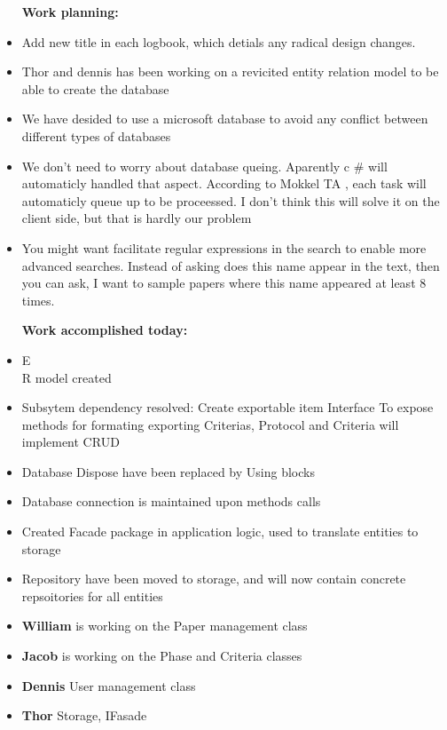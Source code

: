 \begin{itemize}
	\item [\textbf{Work planning:}]
	\item Add new title in each logbook, which detials any radical design changes.
	\item Thor and dennis has been working on a revicited entity relation model to be able to create the database
	\item We have desided to use a microsoft database to avoid any conflict between different types of databases
	\item We don't need to worry about database queing. Aparently c \# will automaticly handled that aspect. According to Mokkel TA , each task will automaticly queue up to be proceessed. I don't think this will solve it on the client side, but that is hardly our problem 
	\item You might want facilitate regular expressions in the search  to enable more advanced searches. Instead of asking does this name appear in the text, then you can ask, I want to sample papers where this name appeared at least 8 times.
	
	\item [\textbf{Work accomplished today:}]
	\item E\\R model created 
	\item Subsytem dependency resolved: Create exportable item Interface To expose methods for formating exporting Criterias, Protocol and Criteria will implement CRUD
	\item Database Dispose have been replaced by Using blocks 
	\item Database connection is maintained upon  methods calls
	\item Created Facade package in application logic, used to translate entities to storage 
	\item Repository have been moved to storage, and will now contain concrete repsoitories for all entities

	\item \textbf{William} is working on the Paper management class
	\item \textbf{Jacob} is working on the Phase and Criteria classes
	\item \textbf{Dennis} User management class
	\item \textbf{Thor} Storage, IFasade
\end{itemize}